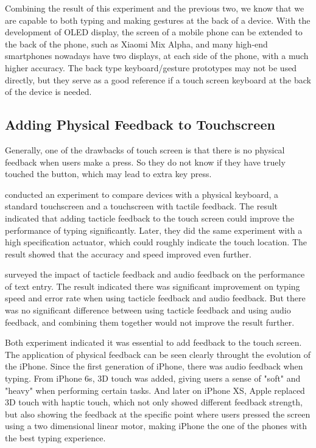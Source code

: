 \documentclass[11pt]{article}
\begin{document}
Combining the result of this experiment and the previous two, we know that we are capable to both typing and making gestures at the back of a device. With the development of OLED display, the screen of a mobile phone can be extended to the back of the phone, such as Xiaomi Mix Alpha, and many high-end smartphones nowadays have two displays, at each side of the phone, with a much higher accuracy. The back type keyboard/gesture prototypes may not be used directly, but they serve as a good reference if a touch screen keyboard at the back of the device is needed. 

\subsection{Adding Physical Feedback to Touchscreen}

Generally, one of the drawbacks of touch screen is that there is no physical feedback when users make a press. So they do not know if they have truely touched the button, which may lead to extra key press.

\citet{10.1145/1357054.1357300} conducted an experiment to compare devices with a physical keyboard, a standard touchscreen and a touchscreen with tactile feedback. The result indicated that adding tacticle feedback to the touch screen could improve the performance of typing significantly. Later, they did the same experiment with a high specification actuator, which could roughly indicate the touch location. The result showed that the accuracy and speed improved even further. 

\citet{10.1145/1518701.1518750} surveyed the impact of tacticle feedback and audio feedback on the performance of text entry. The result indicated there was significant improvement on typing speed and error rate when using tacticle feedback and audio feedback. But there was no significant difference between using tacticle feedback and using audio feedback, and combining them together would not improve the result further. 

Both experiment indicated it was essential to add feedback to the touch screen. The application of physical feedback can be seen clearly throught the evolution of the iPhone. Since the first generation of iPhone, there was audio feedback when typing. From iPhone 6s, 3D touch was added, giving users a sense of "soft" and "heavy" when performing certain tasks. And later on iPhone XS, Apple replaced 3D touch with haptic touch, which not only showed different feedback strength, but also showing the feedback at the specific point where users pressed the screen using a two dimensional linear motor, making iPhone the one of the phones with the best typing experience.
\end{document}
